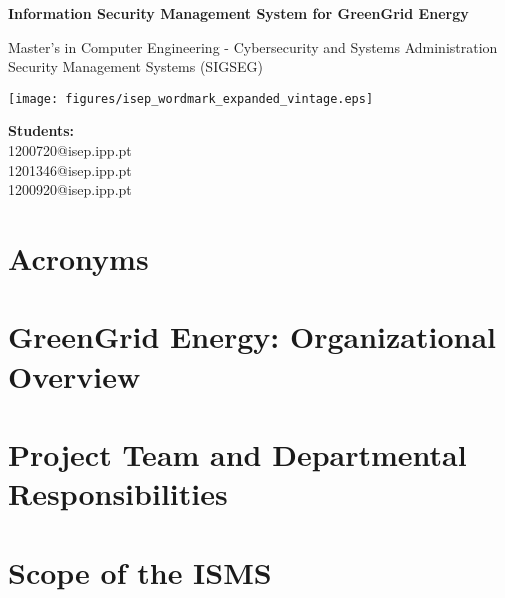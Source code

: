 \documentclass[a4paper,12pt]{report}
\begin{document}
\begin{titlepage}
    \centering
    \vspace*{1.5cm}
    
    \Huge
    \textbf{Information Security Management System for GreenGrid Energy}
    
    \vspace{0.5cm}
    \Large
    Master's in Computer Engineering - Cybersecurity and Systems Administration \\
    Security Management Systems (SIGSEG)
    
    \vspace{1.5cm}
    
    \vfill

    \texttt{[image: figures/isep\_wordmark\_expanded\_vintage.eps]}
    
    \vfill
   
    \textbf{Students:} \\
    1200720@isep.ipp.pt \\
    1201346@isep.ipp.pt \\
    1200920@isep.ipp.pt

    \vfill
\end{titlepage}

\tableofcontents
\newpage
\listoffigures
\chapter*{Acronyms}
\begin{acronym}[XXXX] %

\end{acronym}

\newpage
{}

\chapter{GreenGrid Energy: Organizational Overview}



\chapter{Project Team and Departmental Responsibilities}


\chapter{Scope of the ISMS}



\end{document}

